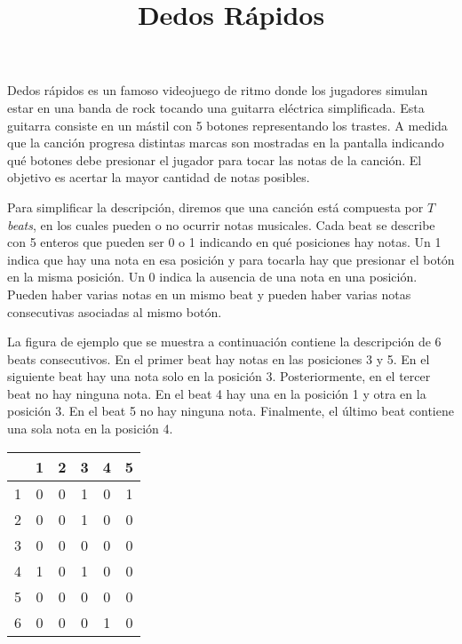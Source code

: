 \documentclass{oci}
\title{Dedos Rápidos}
\begin{document}
\begin{problemDescription}
  Dedos rápidos es un famoso videojuego de ritmo donde los jugadores simulan
  estar en una banda de rock tocando una guitarra eléctrica simplificada.
  Esta guitarra consiste en un mástil con 5 botones representando los trastes.
  A medida que la canción progresa distintas marcas son mostradas en la pantalla
  indicando qué botones debe presionar el jugador para tocar las notas de la canción.
  El objetivo es acertar la mayor cantidad de notas posibles.

  Para simplificar la descripción, diremos que una canción está compuesta por $T$
  \emph{beats}, en los cuales pueden o no ocurrir notas musicales.
  Cada beat se describe con 5 enteros que pueden ser 0 o 1 indicando en qué
  posiciones hay notas.
  Un 1 indica que hay una nota en esa posición y para tocarla hay que presionar
  el botón en la misma posición.
  Un 0 indica la ausencia de una nota en una posición.
  Pueden haber varias notas en un mismo beat y pueden haber varias
  notas consecutivas asociadas al mismo botón.

  La figura de ejemplo que se muestra a continuación contiene la descripción de
  6 beats consecutivos.
  En el primer beat hay notas en las posiciones 3 y 5.
  En el siguiente beat hay una nota solo en la posición 3.
  Posteriormente, en el tercer beat no hay ninguna nota.
  En el beat 4 hay una en la posición 1 y otra en la posición 3.
  En el beat 5 no hay ninguna nota.
  Finalmente, el último beat contiene una sola nota en la posición 4.

  \begin{center}
    \begin{tabular}{r|ccccc}
        & 1 & 2 & 3 & 4 & 5 \\
      \hline
      1 & 0 & 0 & 1 & 0 & 1 \\
      2 & 0 & 0 & 1 & 0 & 0 \\
      3 & 0 & 0 & 0 & 0 & 0 \\
      4 & 1 & 0 & 1 & 0 & 0 \\
      5 & 0 & 0 & 0 & 0 & 0 \\
      6 & 0 & 0 & 0 & 1 & 0 \\
    \end{tabular}
  \end{center}


\end{problemDescription}
\end{document}
